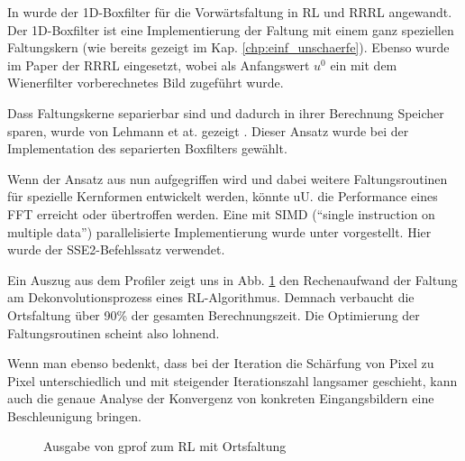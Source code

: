 \documentclass[a4paper,12pt]{article}
\begin{document}
In \cite{vimpaper} wurde der 1D-Boxfilter für die Vorwärtsfaltung
in RL und RRRL angewandt. Der 1D-Boxfilter \cite{mcdonnell} ist eine
Implementierung der Faltung mit einem ganz speziellen Faltungskern 
(wie bereits gezeigt im Kap. \ref{chp:einf_unschaerfe}).
Ebenso wurde im Paper \cite{vimpaper} der RRRL eingesetzt, wobei als Anfangswert
$u^0$ ein mit dem Wienerfilter vorberechnetes Bild zugeführt wurde.

Dass Faltungskerne separierbar sind und dadurch in ihrer Berechnung Speicher
sparen, wurde von Lehmann et at. gezeigt \cite{lehmann}. Dieser Ansatz wurde bei
der Implementation des separierten Boxfilters gewählt.

Wenn der Ansatz aus \cite{vimpaper} nun aufgegriffen wird und dabei weitere
Faltungsroutinen für spezielle Kernformen entwickelt werden, könnte uU. die 
Performance eines FFT
erreicht oder übertroffen werden. Eine mit SIMD ("`single
instruction on multiple data"') paral\-lelisierte Implementierung
wurde unter \cite{sse} vorgestellt. Hier wurde der SSE2-Befehlssatz verwendet.

Ein Auszug aus dem Profiler zeigt uns in Abb. \ref{figure_gprof} den
Rechenaufwand der Faltung am De\-konvolutions\-prozess eines RL-Algorithmus. 
Demnach verbaucht die Ortsfaltung über 90\% der gesamten
Berechnungszeit. Die Optimierung der Faltungsroutinen scheint also lohnend.

Wenn man ebenso bedenkt, dass bei der Iteration die Schärfung von Pixel zu Pixel
unterschiedlich und mit steigender Iterationszahl langsamer \cite{rrrl}
geschieht, kann auch die genaue Analyse der Konvergenz von konkreten
Eingangsbildern eine Beschleunigung bringen.



\begin{figure}[htbp]
\caption{Ausgabe von gprof zum RL mit Ortsfaltung}%
\label{figure_gprof}
\end{figure}
 
\end{document}
